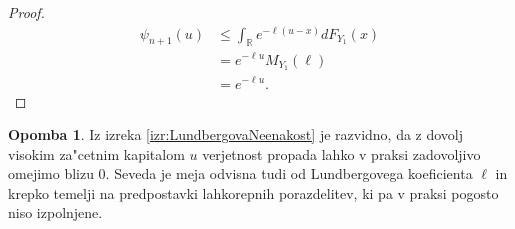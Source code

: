 \documentclass[12pt, a4paper, reqno]{amsart}
\theoremstyle{definition}
\newtheorem{opomba}[definicija]{Opomba}
\theoremstyle{plain}
\newcommand{\R}{\mathbb{R}}
\newcommand{\1}{\mathds{1}}
\begin{document}
\begin{proof}
                \begin{align*}
                    \psi_{n+1}(u) &\leq \int_{\R}e^{-\ell (u - x)}dF_{Y_1}(x) \\
                                  &= e^{-\ell u}M_{Y_1}(\ell) \\
                                  &= e^{-\ell u}.
                \end{align*}

            \end{proof}

            \begin{opomba}
                Iz izreka \ref{izr:LundbergovaNeenakost} je razvidno, da z dovolj visokim za"cetnim kapitalom
                $u$ verjetnost propada lahko v praksi zadovoljivo omejimo blizu $0$. Seveda je meja 
                odvisna tudi od Lundbergovega koeficienta $\ell$ in krepko temelji na predpostavki 
                lahkorepnih porazdelitev, ki pa v praksi pogosto niso izpolnjene.
                \label{op:LundbergovaNeenakost}
            \end{opomba}
\end{document}
